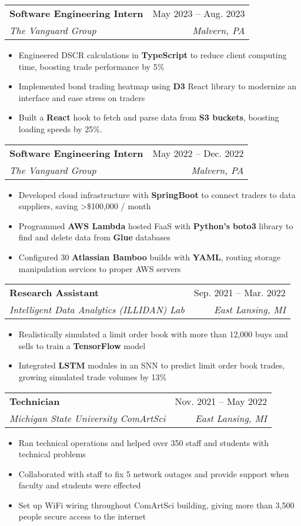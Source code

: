 \documentclass[letterpaper,11pt]{article}
\makeatletter
\newcommand{\resumeItem}[1]{
  \item\small{
    {#1 \vspace{-2pt}}
  }
}
\newcommand{\resumeSubheading}[4]{
  \vspace{-2pt}\item
    \begin{tabular*}{0.97\textwidth}[t]{l@{\extracolsep{\fill}}r}
      \textbf{#1} & #2 \\
      \textit{\small#3} & \textit{\small #4} \\
    \end{tabular*}\vspace{-7pt}
}
\newcommand{\resumeSubSubheading}[2]{
    \item
    \begin{tabular*}{0.97\textwidth}{l@{\extracolsep{\fill}}r}
      \textit{\small#1} & \textit{\small #2} \\
    \end{tabular*}\vspace{-7pt}
}
\newcommand{\resumeSubHeadingListEnd}{\end{itemize}}
\newcommand{\resumeItemListStart}{\begin{itemize}}
\newcommand{\resumeItemListEnd}{\end{itemize}\vspace{-7pt}}
\makeatother
\begin{document}

    \resumeSubheading
      {Software Engineering Intern}{May 2023 -- Aug. 2023}
      {The Vanguard Group}{Malvern, PA}
      \resumeItemListStart
        \resumeItem{Engineered DSCR calculations in \textbf{TypeScript} to reduce client computing time, boosting trade performance by 5\%}
        \resumeItem{Implemented bond trading heatmap using \textbf{D3} React library to modernize an interface and ease stress on traders}
        \resumeItem{Built a \textbf{React} hook to fetch and parse data from \textbf{S3 buckets}, boosting loading speeds by 25\%.}
    \resumeItemListEnd

    \resumeSubheading
      {Software Engineering Intern}{May 2022 -- Dec. 2022}
      {The Vanguard Group}{Malvern, PA}
      \resumeItemListStart
        \resumeItem{Developed cloud infrastructure with \textbf{SpringBoot} to connect traders to data suppliers, saving \textgreater \$100,000 / month}
        \resumeItem{Programmed \textbf{AWS Lambda} hosted FaaS with \textbf{Python's} \textbf{boto3} library to find and delete data from \textbf{Glue} databases}
        \resumeItem{Configured 30 \textbf{Atlassian Bamboo} builds with \textbf{YAML}, routing storage manipulation services to proper AWS servers}
      \resumeItemListEnd
    
      \resumeSubheading
      {Research Assistant}{Sep. 2021 -- Mar. 2022}
      {Intelligent Data Analytics (ILLIDAN) Lab}{East Lansing, MI}
      \resumeItemListStart
        \resumeItem{Realistically simulated a limit order book with more than 12,000 buys and sells to train a \textbf{TensorFlow} model}
        \resumeItem{Integrated \textbf{LSTM} modules in an SNN to predict limit order book trades, growing simulated trade volumes by 13\%}
    \resumeItemListEnd

    \resumeSubheading
        {Technician}{Nov. 2021 -- May 2022}
        {Michigan State University ComArtSci}{East Lansing, MI}
        \resumeItemListStart
        \resumeItem{Ran technical operations and helped over 350 staff and students with technical problems}
        \resumeItem{Collaborated with staff to fix 5 network outages and provide support when faculty and students were effected}
        \resumeItem{Set up WiFi wiring throughout ComArtSci building, giving more than 3,500 people secure access to the internet}
        \resumeItemListEnd
\end{document}
